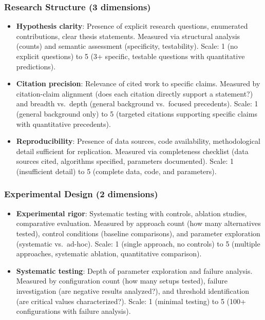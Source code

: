 \subsubsection{Research Structure (3 dimensions)}

\begin{itemize}[leftmargin=*]
\item \textbf{Hypothesis clarity}: Presence of explicit research questions, enumerated contributions, clear thesis statements. Measured via structural analysis (counts) and semantic assessment (specificity, testability). Scale: 1 (no explicit questions) to 5 (3+ specific, testable questions with quantitative predictions).

\item \textbf{Citation precision}: Relevance of cited work to specific claims. Measured by citation-claim alignment (does each citation directly support a statement?) and breadth vs.\ depth (general background vs.\ focused precedents). Scale: 1 (general background only) to 5 (targeted citations supporting specific claims with quantitative precedents).

\item \textbf{Reproducibility}: Presence of data sources, code availability, methodological detail sufficient for replication. Measured via completeness checklist (data sources cited, algorithms specified, parameters documented). Scale: 1 (insufficient detail) to 5 (complete data, code, and parameters).
\end{itemize}

\subsubsection{Experimental Design (2 dimensions)}

\begin{itemize}[leftmargin=*]
\item \textbf{Experimental rigor}: Systematic testing with controls, ablation studies, comparative evaluation. Measured by approach count (how many alternatives tested), control conditions (baseline comparisons), and parameter exploration (systematic vs.\ ad-hoc). Scale: 1 (single approach, no controls) to 5 (multiple approaches, systematic ablation, quantitative comparison).

\item \textbf{Systematic testing}: Depth of parameter exploration and failure analysis. Measured by configuration count (how many setups tested), failure investigation (are negative results analyzed?), and threshold identification (are critical values characterized?). Scale: 1 (minimal testing) to 5 (100+ configurations with failure analysis).
\end{itemize}

